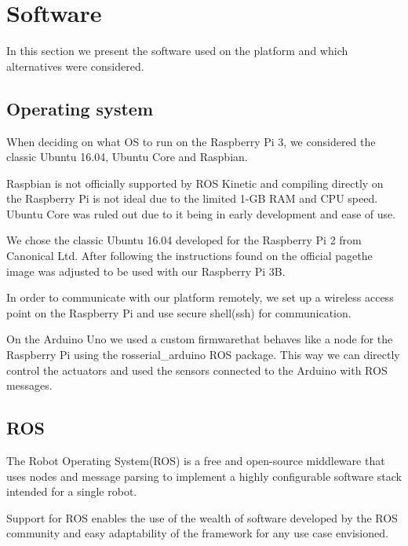 \documentclass[class=report, crop=false]{standalone}
\begin{document}
\section{Software}\label{sec:software}
In this section we present the software used on the platform and which alternatives were considered.

\subsection{Operating system}\label{subsec:os}
When deciding on what OS to run on the Raspberry Pi 3, we considered the classic Ubuntu 16.04, Ubuntu Core and Raspbian.

Raspbian is not officially supported by ROS Kinetic and compiling directly on the Raspberry Pi is not ideal due to the limited 1-GB RAM and CPU speed. Ubuntu Core was ruled out due to it being in early development and ease of use.

We chose the classic Ubuntu 16.04 developed for the Raspberry Pi 2 from Canonical Ltd. After following the instructions found on the official page\footnotemark the image was adjusted to be used with our Raspberry Pi 3B.

In order to communicate with our platform remotely, we set up a wireless access point on the Raspberry Pi and use secure shell(ssh) for communication.

On the Arduino Uno we used a custom firmware\footnotemark that behaves like a node for the Raspberry Pi using the rosserial\_arduino ROS package. This way we can directly control the actuators and used the sensors connected to the Arduino with ROS messages.


\subsection{ROS}\label{subsec:ros}
The Robot Operating System(ROS) is a free and open-source middleware that uses nodes and message parsing to implement a highly configurable software stack intended for a single robot.

Support for ROS enables the use of the wealth of software developed by the ROS community and easy adaptability of the framework for any use case envisioned.
\end{document}
